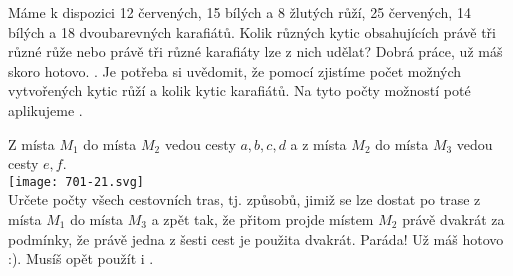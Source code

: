 \documentclass[language = czech]{webquiz}
\begin{document}
	\begin{question} \label{o7} %
		Máme k dispozici 12 červených, 15 bílých a 8 žlutých růží, 25 červených, 14 bílých a 18 dvoubarevných karafiátů. Kolik různých kytic obsahujících právě tři různé růže nebo právě tři různé karafiáty lze z nich udělat?
		\whenRight Dobrá práce, už máš skoro hotovo. .
		\whenWrong Je potřeba si uvědomit, že pomocí  zjistíme počet možných vytvořených kytic růží a kolik kytic karafiátů. Na tyto počty možností poté aplikujeme . 
	\end{question}
	
	\begin{question} \label{o8} %
		Z místa $M_1$ do místa $M_2$ vedou cesty $a, b, c, d$ a z místa $M_2$ do místa $M_3$ vedou cesty $e, f$.\\
		\texttt{[image: 701-21.svg]}\\
		 Určete počty všech cestovních tras, tj. způsobů, jimiž se lze dostat po trase z místa $M_1$ do místa $M_3$ a zpět tak, že přitom projde místem $M_2$ právě dvakrát za podmínky, že právě jedna z šesti cest je použita dvakrát.
		\whenRight Paráda! Už máš hotovo :).
		\whenWrong Musíš opět použít  i .
	\end{question}
	
	
\end{document}
